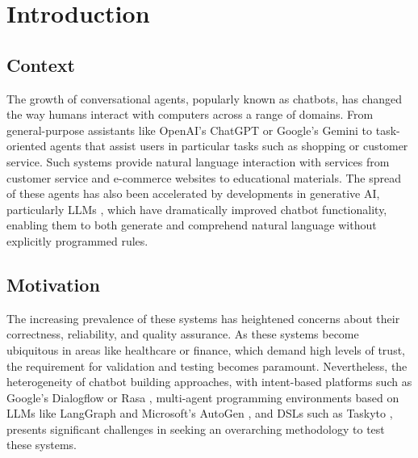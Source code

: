 
\chapter{Introduction}\label{chapter:introduction}

\section{Context}

The growth of conversational agents, popularly known as chatbots,
has changed the way humans interact with computers across a range of domains.
From general-purpose assistants like OpenAI's ChatGPT \autocite{ChatGPT} or Google's Gemini \autocite{GoogleGemini} to task-oriented agents that assist users in particular tasks such as shopping or customer service.
Such systems provide natural language interaction with services from customer service and e-commerce websites to educational materials.
The spread of these agents has also been accelerated by developments in generative \ac{AI}, particularly \acp{LLM} \autocite{minaeeLargeLanguageModels2025}, which have dramatically improved chatbot functionality, enabling them to both generate and comprehend natural language without explicitly programmed rules.

\section{Motivation}

The increasing prevalence of these systems has heightened concerns about their correctness, reliability, and quality assurance.
As these systems become ubiquitous in areas like healthcare or finance, which demand high levels of trust, the requirement for validation and testing becomes paramount.
Nevertheless, the heterogeneity of chatbot building approaches,
with intent-based platforms such as Google's Dialogflow \autocite{Dialogflow} or Rasa \autocite{Rasa2020}, multi-agent programming environments based on \acp{LLM} like LangGraph \autocite{LangGraph} and Microsoft's AutoGen \autocite{AutoGen}, and \acp{DSL} such as Taskyto \autocite{sanchezcuadradoAutomatingDevelopmentTaskoriented2024},
presents significant challenges in seeking an overarching methodology to test these systems.


